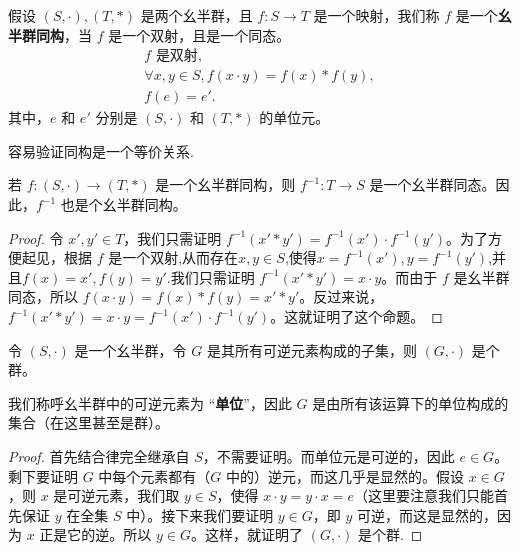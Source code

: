 \documentclass[../../main.tex]{subfiles}
\begin{document}
\begin{definition}[幺半群同构]
假设 $(S, \cdot), (T, *)$ 是两个幺半群，且 $f : S \to T$ 是一个映射，我们称 $f$ 是一个\textbf{幺半群同构}，当 $f$ 是一个双射，且是一个同态。
\begin{gather*}
f \text{ 是双射} ,\\
\forall x, y \in S, f(x \cdot y) = f(x) * f(y) ,\\
f(e) = e' .
\end{gather*}
其中，$e$ 和 $e'$ 分别是 $(S, \cdot)$ 和 $(T, *)$ 的单位元。 
\end{definition}
\begin{remark}
容易验证同构是一个等价关系.
\end{remark}

\begin{proposition}[幺半群同构的逆是幺半群同态]\label{proposition:幺半群同构的逆是幺半群同态}
若 $f : (S, \cdot) \to (T, *)$ 是一个幺半群同构，则 $f^{-1} : T \to S$ 是一个幺半群同态。因此，$f^{-1}$ 也是个幺半群同构。
\end{proposition}
\begin{proof}
令 $x', y' \in T$，我们只需证明 $f^{-1}(x' * y') = f^{-1}(x') \cdot f^{-1}(y')$。为了方便起见，根据 $f$ 是一个双射,从而存在$x,y\in S$,使得$x = f^{-1}(x'), y = f^{-1}(y')$,并且$f(x)=x',f(y)=y'$.我们只需证明 $f^{-1}(x' * y') = x \cdot y$。而由于 $f$ 是幺半群同态，所以 $f(x \cdot y) = f(x) * f(y) = x' * y'$。反过来说，$f^{-1}(x' * y') = x \cdot y = f^{-1}(x') \cdot f^{-1}(y')$。这就证明了这个命题。 
\end{proof}


\begin{lemma}\label{lemma:幺半群中所有可逆元构成了群}
令 $(S, \cdot)$ 是一个幺半群，令 $G$ 是其所有可逆元素构成的子集，则 $(G, \cdot)$ 是个群。
\end{lemma}
\begin{remark}
我们称呼幺半群中的可逆元素为 “\textbf{单位}”，因此 $G$ 是由所有该运算下的单位构成的集合（在这里甚至是群）。
\end{remark}
\begin{proof}
首先结合律完全继承自 $S$，不需要证明。而单位元是可逆的，因此 $e \in G$。剩下要证明 $G$ 中每个元素都有（$G$ 中的）逆元，而这几乎是显然的。假设 $x \in G$，则 $x$ 是可逆元素，我们取 $y \in S$，使得 $x \cdot y = y \cdot x = e$（这里要注意我们只能首先保证 $y$ 在全集 $S$ 中）。接下来我们要证明 $y \in G$，即 $y$ 可逆，而这是显然的，因为 $x$ 正是它的逆。所以 $y \in G$。这样，就证明了 $(G, \cdot)$ 是个群.
\end{proof}
\end{document}

